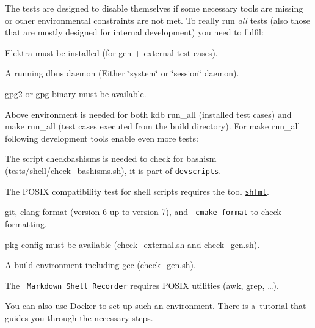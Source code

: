 The tests are designed to disable themselves if some necessary tools are missing or other environmental constraints are not met. To really run {\itshape all} tests (also those that are mostly designed for internal development) you need to fulfil\+:


\begin{DoxyItemize}
\item Elektra must be installed (for gen + external test cases).
\item A running dbus daemon (Either \char`\"{}system\char`\"{} or \char`\"{}session\char`\"{} daemon).
\item {\ttfamily gpg2} or {\ttfamily gpg} binary must be available.
\end{DoxyItemize}

Above environment is needed for both {\ttfamily kdb run\+\_\+all} (installed test cases) and {\ttfamily make run\+\_\+all} (test cases executed from the build directory). For {\ttfamily make run\+\_\+all} following development tools enable even more tests\+:


\begin{DoxyItemize}
\item The script {\ttfamily checkbashisms} is needed to check for bashism ({\ttfamily tests/shell/check\+\_\+bashisms.\+sh}), it is part of \href{https://packages.debian.org/jessie/devscripts}{\texttt{ {\ttfamily devscripts}}}.
\item The P\+O\+S\+IX compatibility test for shell scripts requires the tool \href{https://github.com/mvdan/sh}{\texttt{ {\ttfamily shfmt}}}.
\item {\ttfamily git}, {\ttfamily clang-\/format} (version 6 up to version 7), and \href{https://github.com/cheshirekow/cmake_format}{\texttt{ cmake-\/format}} to check formatting.
\item {\ttfamily pkg-\/config} must be available ({\ttfamily check\+\_\+external.\+sh} and {\ttfamily check\+\_\+gen.\+sh}).
\item A build environment including gcc ({\ttfamily check\+\_\+gen.\+sh}).
\item The \href{https://master.libelektra.org/tests/shell/shell_recorder/tutorial_wrapper}{\texttt{ Markdown Shell Recorder}} requires P\+O\+S\+IX utilities ({\ttfamily awk}, {\ttfamily grep}, …).
\end{DoxyItemize}

You can also use Docker to set up such an environment. There is \mbox{\hyperlink{doc_tutorials_run_all_tests_with_docker_md}{a tutorial}} that guides you through the necessary steps.


